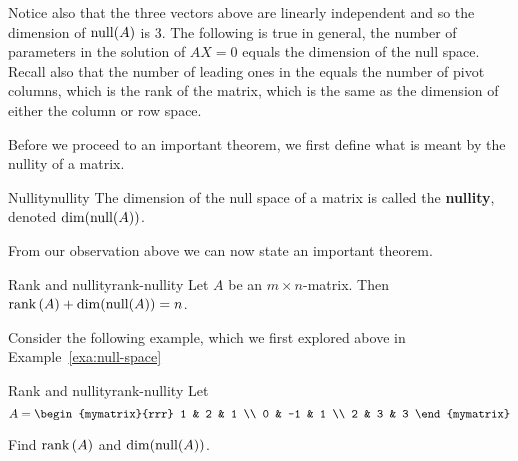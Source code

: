 Notice also that the three vectors above are linearly independent and
so the dimension of $\nullspace(A) $ is 3. The following is true
in general, the number of parameters in the solution of $AX=0$ equals
the dimension of the null space. Recall also that the number of
leading ones in the {\rref} equals the number of pivot columns, which
is the rank of the matrix, which is the same as the dimension of
either the column or row space.

Before we proceed to an important theorem, we first define what is
meant by the nullity of a matrix.

\begin{definition}{Nullity}{nullity}
  The dimension of the null space of a matrix is called the
  \textbf{nullity}, denoted
  $\dim( \nullspace(A))$.
\end{definition}

From our observation above we can now state an important theorem.

\begin{theorem}{Rank and nullity}{rank-nullity}
  Let $A$ be an $m\times n$-matrix. Then
  $\func{rank}\tup{A} + \dim( \nullspace(A)) =n$.
\end{theorem}

Consider the following example, which we first explored above in
Example~\ref{exa:null-space}

\begin{example}{Rank and nullity}{rank-nullity}
  Let
  \begin{equation*}
    A=\begin{mymatrix}{rrr}
      1 & 2 & 1 \\
      0 & -1 & 1 \\
      2 & 3 & 3
    \end{mymatrix}
  \end{equation*}

  Find $\mbox{\rm rank}\left(A\right)$ and $\dim( \nullspace(A))$.
\end{example}

